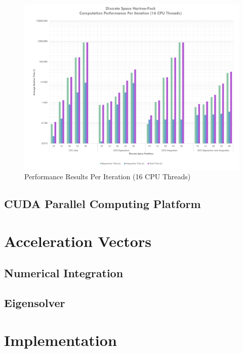 \documentclass[journal, twoside]{IEEEtran}
\begin{document}
\begin{figure}[h]
\centering
\includegraphics[width=7in]{figures/sixteen-core-results.pdf}
\caption{Performance Results Per Iteration (16 CPU Threads)}
\label{perf-results-per-iteration-sixteen-core}
\end{figure}

\subsection{CUDA Parallel Computing Platform}

\cite{nvidia-cuda}
\lipsum[4]

\section{Acceleration Vectors}

\lipsum[4]

\subsection{Numerical Integration}

\lipsum[4]

\subsection{Eigensolver}

\lipsum[4]

\section{Implementation}
\end{document}
